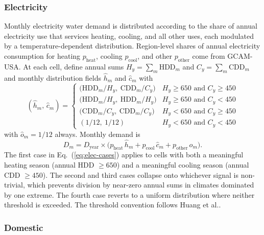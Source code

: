 \documentclass[fleqn,10pt]{wlscirep}
\begin{document}
\subsubsection*{Electricity}

Monthly electricity water demand is distributed according to the share of annual electricity use that services heating, cooling, and all other uses, each modulated by a temperature-dependent distribution. Region-level shares of annual electricity consumption for heating $p_{\mathrm{heat}}$, cooling $p_{\mathrm{cool}}$, and other $p_{\mathrm{other}}$ come from GCAM-USA. At each cell, define annual sums $H_y = \sum_m \text{HDD}_m$ and $C_y = \sum_m \text{CDD}_m$ and monthly distribution fields $\hat{h}_m$ and $\hat{c}_m$ with
\begin{equation}
(\hat{h}_m,\,\hat{c}_m) =
\begin{cases}
\big(\text{HDD}_m / H_y,\ \text{CDD}_m / C_y\big)      & H_y \ge 650 \text{ and } C_y \ge 450 \\[2pt]
\big(\text{HDD}_m / H_y,\ \text{HDD}_m / H_y\big)      & H_y \ge 650 \text{ and } C_y < 450 \\[2pt]
\big(\text{CDD}_m / C_y,\ \text{CDD}_m / C_y\big)      & H_y < 650 \text{ and } C_y \ge 450 \\[2pt]
(1/12,\ 1/12)                                          & H_y < 650 \text{ and } C_y < 450
\end{cases}
\label{eq:elec-cases}
\end{equation}
with $\hat{o}_m = 1/12$ always. Monthly demand is
\begin{equation}
D_m = D_{\mathrm{year}} \times \big(p_{\mathrm{heat}}\,\hat{h}_m + p_{\mathrm{cool}}\,\hat{c}_m + p_{\mathrm{other}}\,\hat{o}_m\big).
\label{eq:elec-demand}
\end{equation}
The first case in Eq.~(\ref{eq:elec-cases}) applies to cells with both a meaningful heating season (annual HDD $\ge 650$) and a meaningful cooling season (annual CDD $\ge 450$). The second and third cases collapse onto whichever signal is non-trivial, which prevents division by near-zero annual sums in climates dominated by one extreme. The fourth case reverts to a uniform distribution where neither threshold is exceeded. The threshold convention follows Huang et al.\cite{hess-22-2117-2018}.

\subsubsection*{Domestic}
\end{document}
